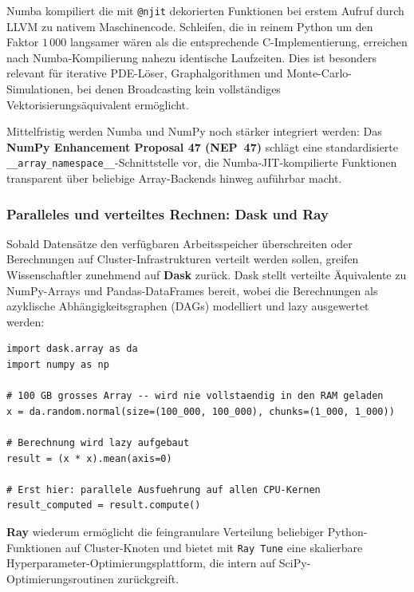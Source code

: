 \documentclass[12pt, a4paper]{article}
\begin{document}
Numba kompiliert die mit \texttt{@njit} dekorierten Funktionen bei erstem
Aufruf durch LLVM zu nativem Maschinencode. Schleifen, die in reinem Python
um den Faktor $1\,000$ langsamer wären als die entsprechende C-Implementierung,
erreichen nach Numba-Kompilierung nahezu identische Laufzeiten. Dies ist
besonders relevant für iterative PDE-Löser, Graphalgorithmen und
Monte-Carlo-Simulationen, bei denen Broadcasting kein vollständiges
Vektorisierungsäquivalent ermöglicht.

Mittelfristig werden Numba und NumPy noch stärker integriert werden:
Das \textbf{NumPy Enhancement Proposal 47 (NEP~47)} schlägt eine
standardisierte \texttt{\_\_array\_namespace\_\_}-Schnittstelle vor, die
Numba-JIT-kompilierte Funktionen transparent über beliebige Array-Backends
hinweg auführbar macht.

\subsubsection{Paralleles und verteiltes Rechnen: Dask und Ray}
\label{subsubsec:dask}

Sobald Datensätze den verfügbaren Arbeitsspeicher überschreiten oder
Berechnungen auf Cluster-Infrastrukturen verteilt werden sollen, greifen
Wissenschaftler zunehmend auf \textbf{Dask} zurück. Dask stellt verteilte
Äquivalente zu NumPy-Arrays und Pandas-DataFrames bereit, wobei die
Berechnungen als azyklische Abhängigkeitsgraphen (DAGs) modelliert und
lazy ausgewertet werden:

\begin{lstlisting}[caption={Dask: Out-of-Core-NumPy fuer gro\ss{}e Datensaetze}]
import dask.array as da
import numpy as np

# 100 GB grosses Array -- wird nie vollstaendig in den RAM geladen
x = da.random.normal(size=(100_000, 100_000), chunks=(1_000, 1_000))

# Berechnung wird lazy aufgebaut
result = (x * x).mean(axis=0)

# Erst hier: parallele Ausfuehrung auf allen CPU-Kernen
result_computed = result.compute()
\end{lstlisting}

\textbf{Ray} wiederum ermöglicht die feingranulare Verteilung beliebiger
Python-Funktionen auf Cluster-Knoten und bietet mit \texttt{Ray Tune}
eine skalierbare Hyperparameter-Optimierungsplattform, die intern auf
SciPy-Optimierungsroutinen zurückgreift.
\end{document}

